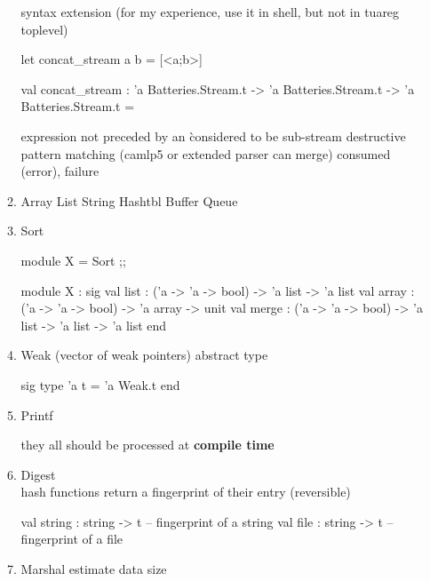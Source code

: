 \begin{enumerate}
\begin{enumerate}
      syntax extension (for my experience, use it in shell, but not in
      tuareg toplevel)
\begin{ocamlcode}
  let concat_stream a b = [<a;b>]
\end{ocamlcode}
\begin{ocamlcode}
val concat_stream :
  'a Batteries.Stream.t -> 'a Batteries.Stream.t -> 'a Batteries.Stream.t =
\end{ocamlcode}
   expression not preceded by an \` considered to be sub-stream
   destructive pattern matching (camlp5 or extended parser can merge)
   consumed (error), failure
    \item Array List String Hashtbl Buffer Queue
    \item Sort

\begin{ocamlcode}
module X = Sort ;;
\end{ocamlcode}

\begin{ocamlcode}
module X :
  sig
    val list : ('a -> 'a -> bool) -> 'a list -> 'a list
    val array : ('a -> 'a -> bool) -> 'a array -> unit
    val merge : ('a -> 'a -> bool) -> 'a list -> 'a list -> 'a list
  end
\end{ocamlcode}

    \item Weak (vector of weak pointers) abstract type

\begin{ocamlcode}
sig
  type 'a t = 'a Weak.t
end 
\end{ocamlcode}


    \item Printf

\begin{ocamlcode}
\end{ocamlcode}
they all should be processed at \textbf{compile time}


    \item Digest \\
      hash functions return a fingerprint of their entry (reversible) 

\begin{ocamlcode}
   val string : string -> t -- fingerprint of a string
   val file : string -> t -- fingerprint of a file 
\end{ocamlcode}

    \item Marshal estimate data size


\end{enumerate}
\end{enumerate}
